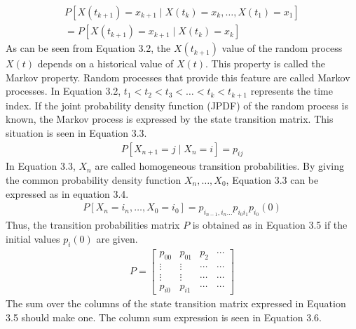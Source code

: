 \documentclass[12pt,twoside,a4]{mwbk}
\begin{document}
\begin{subequations}
\begin{align}
        P\left[X\left(t_{k+1}\right)=x_{k+1} \mid X\left(t_{k}\right)=x_{k}, \ldots, X\left(t_{1}\right)=x_{1}\right] \\ =P\left[X\left(t_{k+1}\right)=x_{k+1} \mid X\left(t_{k}\right)=x_{k}\right]
\end{align}
\end{subequations}
As can be seen from Equation 3.2, the $X\left(t_{k+1}\right)$ value of the random process $X(t)$ depends on a historical value of $X(t)$. This property is called the Markov property. Random processes that provide this feature are called Markov processes. In Equation 3.2, $t_{1}<t_{2}<t_{3}<\ldots<t_{k}<t_{k+1}$ represents the time index. If the joint probability density function (JPDF) of the random process is known, the Markov process is expressed by the state transition matrix. This situation is seen in Equation 3.3.
\begin{subequations}
\begin{align}
        P\left[X_{n+1}=j \mid X_{n}=i\right]=p_{i j}
\end{align}
\end{subequations}
In Equation 3.3, $X_{n}$ are called homogeneous transition probabilities. By giving the common probability density function $X_{n}, \ldots, X_{0}$, Equation 3.3 can be expressed as in equation 3.4.
\begin{subequations}
\begin{align}
        P\left[X_{n}=i_{n}, \ldots, X_{0}=i_{0}\right]=p_{i_{n-1}, i_{n} \ldots} p_{i_{0} i_{1}} p_{i_{0}}(0)
\end{align}
\end{subequations}
Thus, the transition probabilities matrix $P$ is obtained as in Equation 3.5 if the initial values $p_{i}(0)$ are given.
\begin{subequations}
\begin{align}
        P=\left[\begin{array}{cccc}
        p_{00} & p_{01} & p_{2} & \cdots \\
        \vdots & \vdots & \cdots & \cdots \\
        \vdots & \vdots & \cdots & \cdots \\
        p_{i 0} & p_{i 1} & \cdots & \cdots
        \end{array}\right]
\end{align}
\end{subequations}
The sum over the columns of the state transition matrix expressed in Equation 3.5 should make one. The column sum expression is seen in Equation 3.6.
\end{document}
